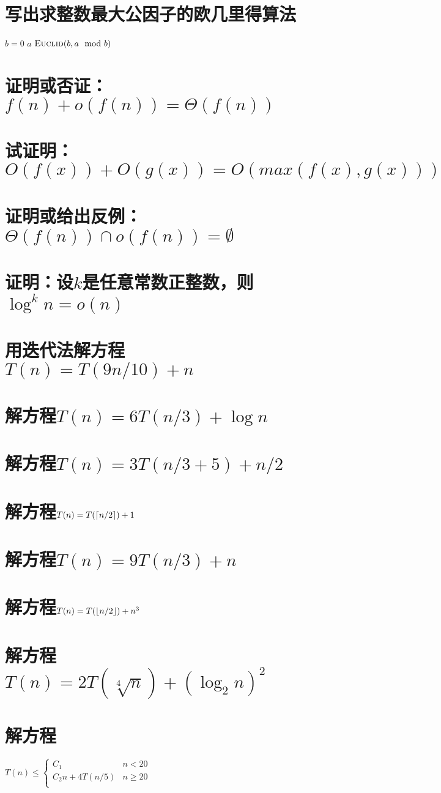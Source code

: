 \documentclass{article}
\DeclarePairedDelimiter{\ceil}{\lceil}{\rceil}
\DeclarePairedDelimiter{\floor}{\lfloor}{\rfloor}
\begin{document}
\section{写出求整数最大公因子的欧几里得算法}
\large {
\begin{codebox}
  \li \If $b = 0$
  \li  \Then  \Return $a$
  \li \ElseNoIf \Return $\textnormal{\scshape Euclid}(b, a\mod b)$
      \End
\end{codebox}
}

\section{证明或否证：$f(n)+o(f(n))=\Theta(f(n))$}

\section{试证明：$O(f(x))+O(g(x))=O(max(f(x), g(x)))$}

\section{证明或给出反例：$\Theta(f(n)) \cap o(f(n)) = \emptyset $}

\section{证明：设$k$是任意常数正整数，则$\log^kn=o(n)$}

\section{用迭代法解方程$T(n)=T(9n/10)+n$}

\section{解方程$T(n)=6T(n/3)+\log n$}

\section{解方程$T(n)=3T(n/3+5)+n/2$}

\section{解方程$T(n)=T(\ceil {n/2})+1$}

\section{解方程$T(n)=9T(n/3)+n$}

\section{解方程$T(n)=T(\floor {n/2})+n^3$}

\section{解方程$T(n)=2T(\sqrt[4]n)+(\log_2n)^2$}


\section{解方程}
\large {
  $
  T(n) \leq \begin{cases}
    C_1 & n < 20\\
    C_2n+4T(n/5) & n \geq 20\\
  \end{cases}
  $
}
\end{document}
